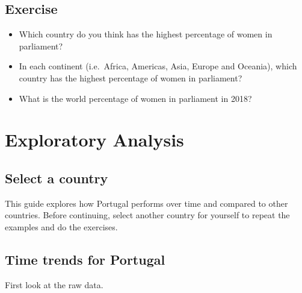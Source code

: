 \documentclass[a4paper,9pt,twocolumn,twoside,printwatermark=false]{pinp}
\providecommand{\tightlist}{%
  \setlength{\itemsep}{0pt}\setlength{\parskip}{0pt}}
\begin{document}
\subsection{Exercise}\label{exercise-3}

\begin{itemize}
\tightlist
\item
  Which country do you think has the highest percentage of women in
  parliament?
\item
  In each continent (i.e.~Africa, Americas, Asia, Europe and Oceania),
  which country has the highest percentage of women in parliament?
\item
  What is the world percentage of women in parliament in 2018?
\end{itemize}

\section{Exploratory Analysis}\label{exploratory-analysis}

\subsection{Select a country}\label{select-a-country}

This guide explores how Portugal performs over time and compared to
other countries. Before continuing, select another country for yourself
to repeat the examples and do the exercises.

\subsection{Time trends for Portugal}\label{time-trends-for-portugal}

First look at the raw data.
\end{document}
